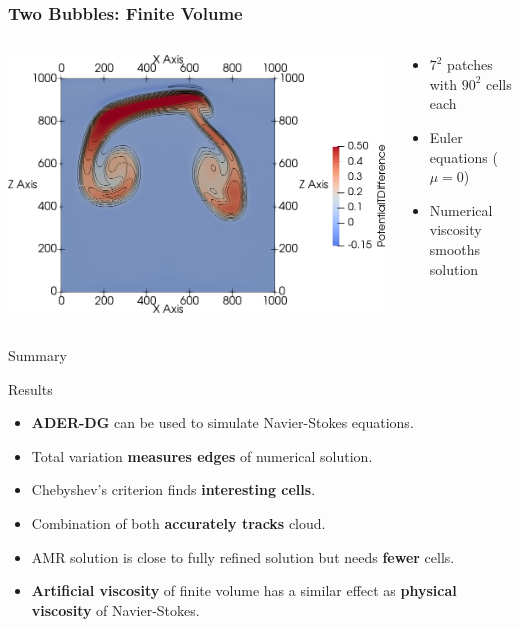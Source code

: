 \documentclass[aspectratio=169]{beamer}
\begin{document}
\begin{frame}
  \frametitle{Two Bubbles: Finite Volume}
  \begin{columns}
    \begin{column}{0.6\textwidth}
  \begin{center}
    \includegraphics[width=1.0\textwidth]{paper_two_bubbles_fv}
  \end{center}
    \end{column}
    \begin{column}{0.4\textwidth}
      \begin{itemize}
      \item $7^2$ patches with $90^2$ cells each
      \item Euler equations ($\mu = 0$)
      \item Numerical viscosity smooths solution
      \end{itemize}
    \end{column}
  \end{columns}
\end{frame}

\begin{frame}{Summary}
  \begin{block}{Results}
    \begin{itemize}
    \item \textbf{ADER-DG} can be used to simulate Navier-Stokes equations.
    \item Total variation \textbf{measures edges} of numerical solution.
    \item Chebyshev's criterion finds \textbf{interesting cells}.
    \item Combination of both \textbf{accurately tracks} cloud.
    \item AMR solution is close to fully refined solution but needs \textbf{fewer} cells.
    \item \textbf{Artificial viscosity} of finite volume has a similar effect as \textbf{physical viscosity} of Navier-Stokes.  
    \end{itemize}
  \end{block}
\end{frame}
\end{document}

